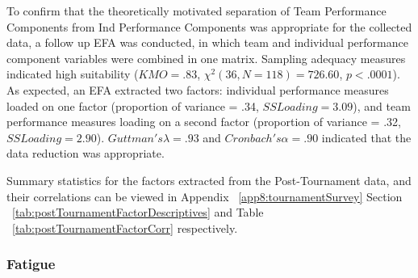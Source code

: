 To confirm that the theoretically motivated separation of Team Performance Components from Ind Performance Components was appropriate for the collected data, a follow up EFA was conducted, in which team and individual performance component variables were combined in one matrix. Sampling adequacy measures indicated high suitability ($KMO = .83$, $\chi^2(36, N = 118) = 726.60$, $p < .0001$).  As expected, an EFA extracted two factors: individual performance measures loaded on one factor (proportion of variance = .34, $SS Loading = 3.09$), and team performance measures loading on a second factor (proportion of variance = .32, $SS Loading = 2.90$). $Guttman's \lambda =.93$ and $Cronbach's \alpha = .90$ indicated that the data reduction was appropriate.




Summary statistics for the factors extracted from the Post-Tournament data, and their correlations can be viewed in Appendix ~\ref{app8:tournamentSurvey} Section
 ~\ref{tab:postTournamentFactorDescriptives} and Table ~\ref{tab:postTournamentFactorCorr} respectively.



\newpage
{} %
\begin{landscape}






\clearpage




\clearpage




\end{landscape}
\restoregeometry








\subsubsection{Fatigue \label{app8:fatigueEFA}}

